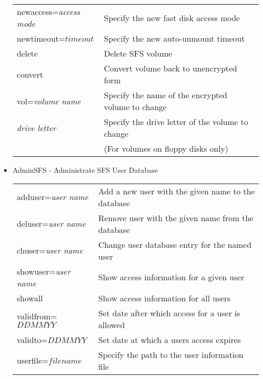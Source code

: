 \begin{itemize}
\begin{tabular}{l p{209.2pt} }
  newaccess={\em access mode} & Specify the new fast disk access mode\\

  newtimeout=$timeout$        & Specify the new auto-unmount timeout\\

  delete                    & Delete SFS volume\\

  convert                   & Convert volume back to unencrypted form\\

  vol={\em volume name}     & Specify the name of the encrypted volume to change\\

  {\em drive letter}        & Specify the drive letter of the volume to change\\
                            & (For volumes on floppy disks only)\\
  \end{tabular}

\item AdminSFS - Administrate SFS User Database

  \begin{tabular}{l p{208.6pt} }

  adduser={\em user name} & Add a new user with the given name to the database\\

  deluser={\em user name} & Remove user with the given name from the database\\

  chuser={\em user name}  & Change user database entry for the named user\\

  showuser={\em user name}& Show access information for a given user\\

  showall                 & Show access information for all users\\

  validfrom=$DDMMYY$      & Set date after which access for a user is allowed\\

  validto=$DDMMYY$        & Set date at which a users access expires\\

  userfile=$filename$     & Specify the path to the user information file\\

  \end{tabular}

\end{itemize}

